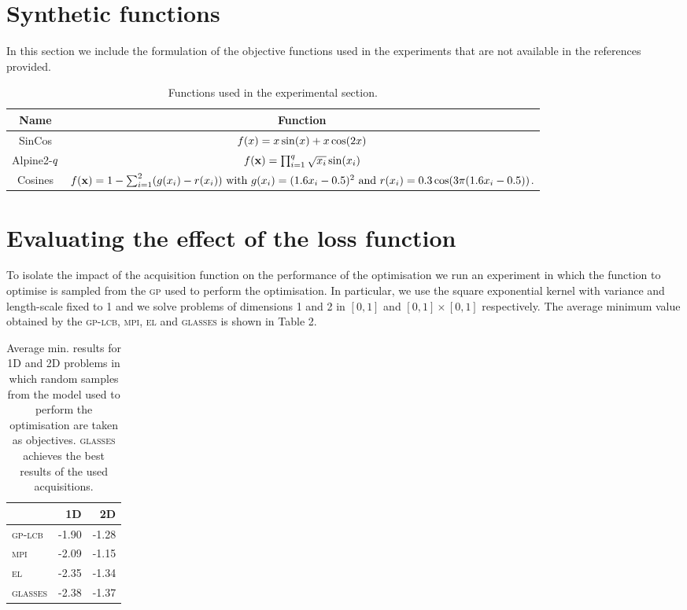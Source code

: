 \documentclass[twoside]{article}
\newcommand{\acr}[1]{\textsc{#1}\xspace}
\newcommand{\gp}{\acr{gp}}
\newcommand{\us}{\acr{glasses}}
\newcommand{\mpi}{\acr{mpi}}
\newcommand{\el}{\acr{el}}
\newcommand{\lcb}{\acr{gp-lcb}}
\begin{document}
\section{Synthetic functions}

In this section we include the formulation of the objective functions used in the experiments that are not available in the references provided. 


\begin{table}[h!]
\centering
\begin{tabular}{cc}
\toprule
Name & Function     \\
\midrule
SinCos & $f(x) = x \sin(x) + x \cos(2x)$  \\
Alpine2-$q$ & $f(\mathbf{x}) =\prod_{i=1}^{q} \sqrt{x_i}\sin(x_i)$  \\
Cosines &  $f(\mathbf{x}) = 1- \sum_{i=1}^2 (g(x_i) - r(x_i) )  \mbox{ with } g(x_i) = (1.6x_i - 0.5)^2 \mbox{ and } r(x_i) = 0.3 \cos (3\pi (1.6 x_i -0.5))$. \\
\bottomrule
\end{tabular}\caption{Functions used in the experimental section.}\label{table:functions_test}
\end{table}

\section{Evaluating the effect of the loss function}

To isolate the impact of the acquisition function on the performance of the optimisation we run an experiment in which the function to optimise is sampled from the \gp used to perform the optimisation. In particular, we use the square exponential kernel with variance and length-scale fixed to 1 and we solve problems of dimensions 1 and 2 in $[0,1]$ and $[0,1]\times[0,1]$ respectively. The average minimum value obtained by the \lcb, \mpi, \el and \us is shown in Table 2.

\begin{table}[h!]
\begin{center}\label{table:resutls_isolation}
\begin{tabular}{lrr}
\toprule
{} &     1D &    2D \\
\midrule
\lcb        &     -1.90  &  -1.28\\
\mpi          &    -2.09  &  -1.15\\
\el            &    -2.35  &  -1.34\\
\us  &  -2.38 &   -1.37\\
\bottomrule
\end{tabular}\caption{Average min. results for 1D and 2D problems in which random samples from the model used to perform the optimisation are taken as objectives. \us achieves the best results of the used acquisitions.}
\end{center}
\end{table}
\end{document}
